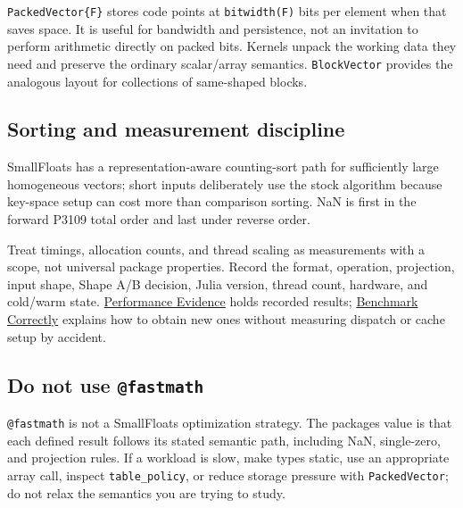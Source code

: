 \label{6218373738827998574}{}


\texttt{PackedVector\{F\}} stores code points at \texttt{bitwidth(F)} bits per element when that saves space. It is useful for bandwidth and persistence, not an invitation to perform arithmetic directly on packed bits. Kernels unpack the working data they need and preserve the ordinary scalar/array semantics. \texttt{BlockVector} provides the analogous layout for collections of same-shaped blocks.



\subsection{Sorting and measurement discipline}



\label{1253586417655733473}{}


SmallFloats has a representation-aware counting-sort path for sufficiently large homogeneous vectors; short inputs deliberately use the stock algorithm because key-space setup can cost more than comparison sorting. NaN is first in the forward P3109 total order and last under reverse order.



Treat timings, allocation counts, and thread scaling as measurements with a scope, not universal package properties. Record the format, operation, projection, input shape, Shape A/B decision, Julia version, thread count, hardware, and cold/warm state. \href{examples\_\allowbreak{}performance.md}{Performance Evidence} holds recorded results; \href{internals\_\allowbreak{}benchmark.md}{Benchmark Correctly} explains how to obtain new ones without measuring dispatch or cache setup by accident.



\subsection{Do not use \texttt{@fastmath}}



\label{1769973427897829437}{}


\texttt{@fastmath} is not a SmallFloats optimization strategy. The package{\textquotesingle}s value is that each defined result follows its stated semantic path, including NaN, single-zero, and projection rules. If a workload is slow, make types static, use an appropriate array call, inspect \texttt{table\_\allowbreak{}policy}, or reduce storage pressure with \texttt{PackedVector}; do not relax the semantics you are trying to study.




